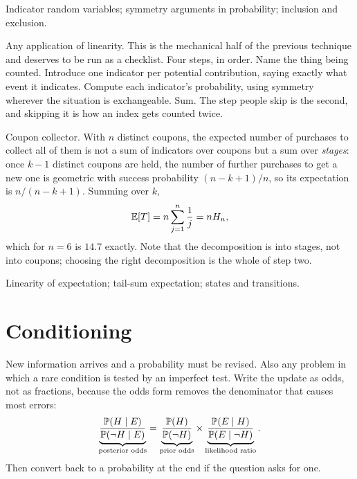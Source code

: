 \begin{seealsob}Indicator random variables; symmetry arguments in probability; inclusion and exclusion.\end{seealsob}

\cue Any application of linearity. This is the mechanical half of the previous technique and deserves to be run as a checklist.
\method Four steps, in order. Name the thing being counted. Introduce one indicator per potential contribution, saying exactly what event it indicates. Compute each indicator's probability, using symmetry wherever the situation is exchangeable. Sum. The step people skip is the second, and skipping it is how an index gets counted twice.

\begin{worked}
Coupon collector. With $n$ distinct coupons, the expected number of purchases to collect all of them is not a sum of indicators over coupons but a sum over \emph{stages}: once $k-1$ distinct coupons are held, the number of further purchases to get a new one is geometric with success probability $(n-k+1)/n$, so its expectation is $n/(n-k+1)$. Summing over $k$,
\[
\mathbb{E}[T]=n\sum_{j=1}^{n}\frac{1}{j}=nH_{n},
\]
which for $n=6$ is $14.7$ exactly. Note that the decomposition is into stages, not into coupons; choosing the right decomposition is the whole of step two.
\end{worked}

\begin{seealsob}Linearity of expectation; tail-sum expectation; states and transitions.\end{seealsob}

\section{Conditioning}

\cue New information arrives and a probability must be revised. Also any problem in which a rare condition is tested by an imperfect test.
\method Write the update as odds, not as fractions, because the odds form removes the denominator that causes most errors:
\[
\underbrace{\frac{\mathbb{P}(H\mid E)}{\mathbb{P}(\lnot H\mid E)}}_{\text{posterior odds}}=\underbrace{\frac{\mathbb{P}(H)}{\mathbb{P}(\lnot H)}}_{\text{prior odds}}\times\underbrace{\frac{\mathbb{P}(E\mid H)}{\mathbb{P}(E\mid \lnot H)}}_{\text{likelihood ratio}}.
\]
Then convert back to a probability at the end if the question asks for one.


